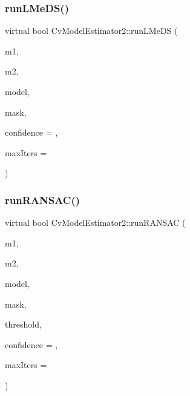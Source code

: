 \mbox{\label{class_cv_model_estimator2_a15486b3aea44ad7247924dd1532ce5a8}} 
\subsubsection{\texorpdfstring{run\+L\+Me\+D\+S()}{runLMeDS()}}
{\footnotesize\ttfamily virtual bool Cv\+Model\+Estimator2\+::run\+L\+Me\+DS (\begin{DoxyParamCaption}\item[{const Cv\+Mat $\ast$}]{m1,  }\item[{const Cv\+Mat $\ast$}]{m2,  }\item[{Cv\+Mat $\ast$}]{model,  }\item[{Cv\+Mat $\ast$}]{mask,  }\item[{double}]{confidence = {},  }\item[{int}]{max\+Iters = {} }\end{DoxyParamCaption})\hspace{0.3cm}{\ttfamily [virtual]}}

\mbox{\label{class_cv_model_estimator2_af44a8168c5416e210819c7eea380ac66}} 
\subsubsection{\texorpdfstring{run\+R\+A\+N\+S\+A\+C()}{runRANSAC()}}
{\footnotesize\ttfamily virtual bool Cv\+Model\+Estimator2\+::run\+R\+A\+N\+S\+AC (\begin{DoxyParamCaption}\item[{const Cv\+Mat $\ast$}]{m1,  }\item[{const Cv\+Mat $\ast$}]{m2,  }\item[{Cv\+Mat $\ast$}]{model,  }\item[{Cv\+Mat $\ast$}]{mask,  }\item[{double}]{threshold,  }\item[{double}]{confidence = {},  }\item[{int}]{max\+Iters = {} }\end{DoxyParamCaption})\hspace{0.3cm}{\ttfamily [virtual]}}

